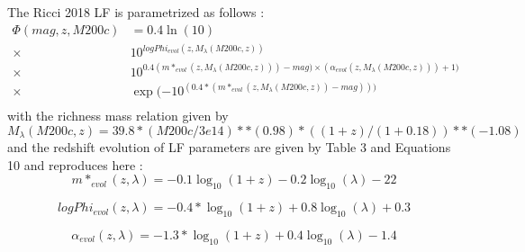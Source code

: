 \documentclass[fleqn,usenatbib,onecolumn]{mnras}
\begin{document}
The Ricci 2018 LF is parametrized as follows :
\begin{align}
\Phi(mag,z,M200c) & = 0.4 \ln(10) \\ 
\times & 10^{logPhi_{evol}(z, M_\lambda(M200c,z))}    \\
\times & 10^{ 0.4  (m*_{evol}(z, M_\lambda(M200c,z))) - mag) \times (\alpha_{evol}(z, M_\lambda(M200c,z))) + 1)} \\
\times & \exp{( -10^ {( 0.4 * (m*_{evol}(z,M_\lambda(M200c, z)) - mag)))} } \\
\end{align}
with the richness mass relation given by 
\begin{equation}
M_\lambda(M200c, z) = 39.8 * (M200c/3e14)**(0.98) * ((1+z)/(1+0.18))**(-1.08)
\end{equation}
and the redshift evolution of LF parameters are given by Table 3 and Equations 10 and reproduces here :
\begin{equation}
m*_{evol} (z, \lambda) =  - 0.1 \log_{10}(1 + z) - 0.2 \log_{10}(\lambda) - 22
\end{equation}

\begin{equation}
logPhi_{evol} (z, \lambda) =  -0.4 * \log_{10}(1 + z) + 0.8  \log_{10}(\lambda) + 0.3
\end{equation}

\begin{equation}
\alpha_{evol} (z, \lambda) =  -1.3 * \log_{10}(1 + z) + 0.4  \log_{10}(\lambda) - 1.4
\end{equation}
\end{document}
